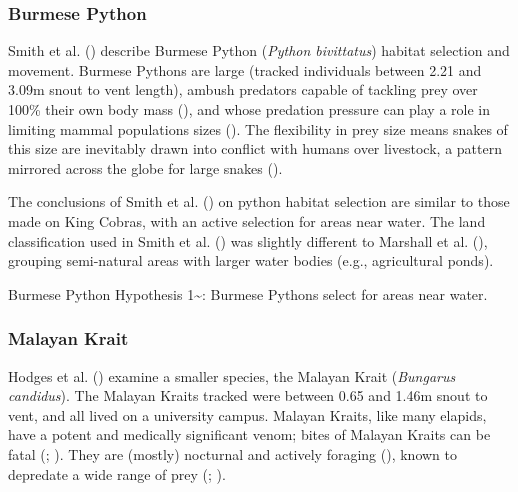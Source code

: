 \documentclass[10pt,a4paper]{article}
\begin{document}
\subsubsection{Burmese Python}\label{burmese-python}

Smith et al. () describe Burmese Python (\emph{Python bivittatus}) habitat selection and movement.
Burmese Pythons are large (tracked individuals between 2.21 and 3.09m snout to vent length), ambush predators capable of tackling prey over 100\% their own body mass (), and whose predation pressure can play a role in limiting mammal populations sizes ().
The flexibility in prey size means snakes of this size are inevitably drawn into conflict with humans over livestock, a pattern mirrored across the globe for large snakes ().

The conclusions of Smith et al. () on python habitat selection are similar to those made on King Cobras, with an active selection for areas near water.
The land classification used in Smith et al. () was slightly different to Marshall et al. (), grouping semi-natural areas with larger water bodies (e.g., agricultural ponds).

Burmese Python Hypothesis 1\textasciitilde: Burmese Pythons select for areas near water.

\subsubsection{Malayan Krait}\label{malayan-krait}

Hodges et al. () examine a smaller species, the Malayan Krait (\emph{Bungarus candidus}).
The Malayan Kraits tracked were between 0.65 and 1.46m snout to vent, and all lived on a university campus.
Malayan Kraits, like many elapids, have a potent and medically significant venom; bites of Malayan Kraits can be fatal (; ).
They are (mostly) nocturnal and actively foraging (), known to depredate a wide range of prey (; ).
\end{document}
